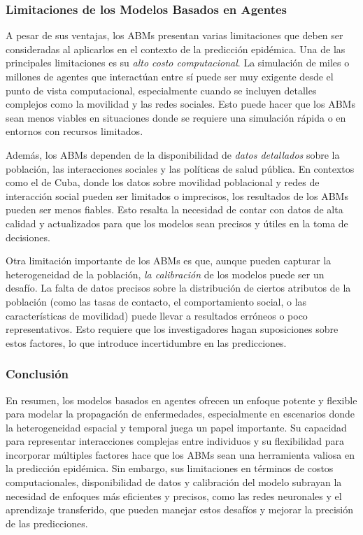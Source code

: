 \subsubsection{Limitaciones de los Modelos Basados en Agentes}

A pesar de sus ventajas, los ABMs presentan varias limitaciones que deben ser consideradas al aplicarlos en el contexto de la predicción epidémica. Una de las principales limitaciones es su \textit{alto costo computacional}. La simulación de miles o millones de agentes que interactúan entre sí puede ser muy exigente desde el punto de vista computacional, especialmente cuando se incluyen detalles complejos como la movilidad y las redes sociales. Esto puede hacer que los ABMs sean menos viables en situaciones donde se requiere una simulación rápida o en entornos con recursos limitados.

Además, los ABMs dependen de la disponibilidad de \textit{datos detallados} sobre la población, las interacciones sociales y las políticas de salud pública. En contextos como el de Cuba, donde los datos sobre movilidad poblacional y redes de interacción social pueden ser limitados o imprecisos, los resultados de los ABMs pueden ser menos fiables. Esto resalta la necesidad de contar con datos de alta calidad y actualizados para que los modelos sean precisos y útiles en la toma de decisiones.

Otra limitación importante de los ABMs es que, aunque pueden capturar la heterogeneidad de la población, \textit{la calibración} de los modelos puede ser un desafío. La falta de datos precisos sobre la distribución de ciertos atributos de la población (como las tasas de contacto, el comportamiento social, o las características de movilidad) puede llevar a resultados erróneos o poco representativos. Esto requiere que los investigadores hagan suposiciones sobre estos factores, lo que introduce incertidumbre en las predicciones.

\subsubsection{Conclusión}

En resumen, los modelos basados en agentes ofrecen un enfoque potente y flexible para modelar la propagación de enfermedades, especialmente en escenarios donde la heterogeneidad espacial y temporal juega un papel importante. Su capacidad para representar interacciones complejas entre individuos y su flexibilidad para incorporar múltiples factores hace que los ABMs sean una herramienta valiosa en la predicción epidémica. Sin embargo, sus limitaciones en términos de costos computacionales, disponibilidad de datos y calibración del modelo subrayan la necesidad de enfoques más eficientes y precisos, como las redes neuronales y el aprendizaje transferido, que pueden manejar estos desafíos y mejorar la precisión de las predicciones.

